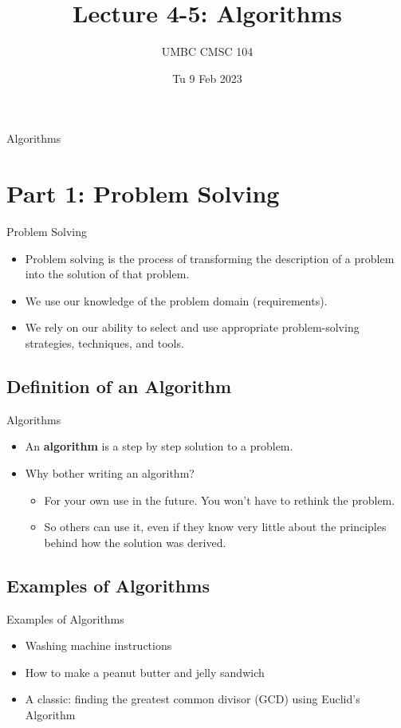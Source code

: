 \documentclass[graphics]{beamer}
\title{Lecture 4-5: Algorithms}
\author{UMBC CMSC 104}
\date{Tu 9 Feb 2023}
\begin{document}
\begin{frame}{}
\centering
    Algorithms
\end{frame}

\frame{\tableofcontents}

\section{Part 1: Problem Solving}
\begin{frame}{Problem Solving}
    \begin{itemize}
        \item Problem solving is the process of transforming the description of a problem into the solution of that problem.
        \item We use our knowledge of the problem domain (requirements).
        \item We rely on our ability to select and use appropriate problem-solving strategies, techniques, and tools.
    \end{itemize}
\end{frame}

\subsection{Definition of an Algorithm}
\begin{frame}{Algorithms}
    \begin{itemize}
        \item An \textbf{algorithm} is a step by step solution to a problem.
        \item Why bother writing an algorithm?
        \begin{itemize}
            \item For your own use in the future.  You won’t have to rethink the problem.
            \item So others can use it, even if they know very little about the principles behind how the solution was derived.
        \end{itemize}
    \end{itemize}
\end{frame}

\subsection{Examples of Algorithms}
\begin{frame}{Examples of Algorithms}
    \begin{itemize}
        \item Washing machine instructions
        \item How to make a peanut butter and jelly sandwich
        \item A classic: finding the greatest common divisor (GCD) using Euclid’s Algorithm
    \end{itemize}
\end{frame}
\end{document}
